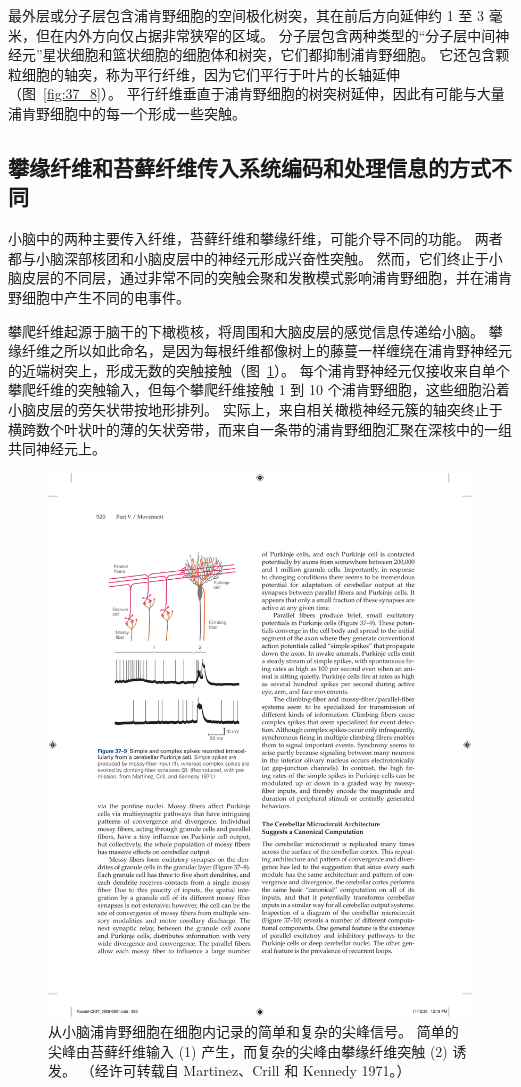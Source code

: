 最外层或分子层包含浦肯野细胞的空间极化树突，其在前后方向延伸约 1 至 3 毫米，但在内外方向仅占据非常狭窄的区域。
分子层包含两种类型的“分子层中间神经元”星状细胞和篮状细胞的细胞体和树突，它们都抑制浦肯野细胞。
它还包含颗粒细胞的轴突，称为平行纤维，因为它们平行于叶片的长轴延伸（图~\ref{fig:37_8}）。
平行纤维垂直于浦肯野细胞的树突树延伸，因此有可能与大量浦肯野细胞中的每一个形成一些突触。



\subsection{攀缘纤维和苔藓纤维传入系统编码和处理信息的方式不同}

小脑中的两种主要传入纤维，苔藓纤维和攀缘纤维，可能介导不同的功能。
两者都与小脑深部核团和小脑皮层中的神经元形成兴奋性突触。
然而，它们终止于小脑皮层的不同层，通过非常不同的突触会聚和发散模式影响浦肯野细胞，并在浦肯野细胞中产生不同的电事件。


攀爬纤维起源于脑干的下橄榄核，将周围和大脑皮层的感觉信息传递给小脑。
攀缘纤维之所以如此命名，是因为每根纤维都像树上的藤蔓一样缠绕在浦肯野神经元的近端树突上，形成无数的突触接触（图~\ref{fig:37_9}）。
每个浦肯野神经元仅接收来自单个攀爬纤维的突触输入，但每个攀爬纤维接触 1 到 10 个浦肯野细胞，这些细胞沿着小脑皮层的旁矢状带按地形排列。
实际上，来自相关橄榄神经元簇的轴突终止于横跨数个叶状叶的薄的矢状旁带，而来自一条带的浦肯野细胞汇聚在深核中的一组共同神经元上。


\begin{figure}[htbp]
	\centering
	\includegraphics[width=0.45\linewidth]{chap37/fig_37_9}
	\caption{从小脑浦肯野细胞在细胞内记录的简单和复杂的尖峰信号。 简单的尖峰由苔藓纤维输入 (1) 产生，而复杂的尖峰由攀缘纤维突触 (2) 诱发。 （经许可转载自 Martinez、Crill 和 Kennedy 1971。）}
	\label{fig:37_9}
\end{figure}


